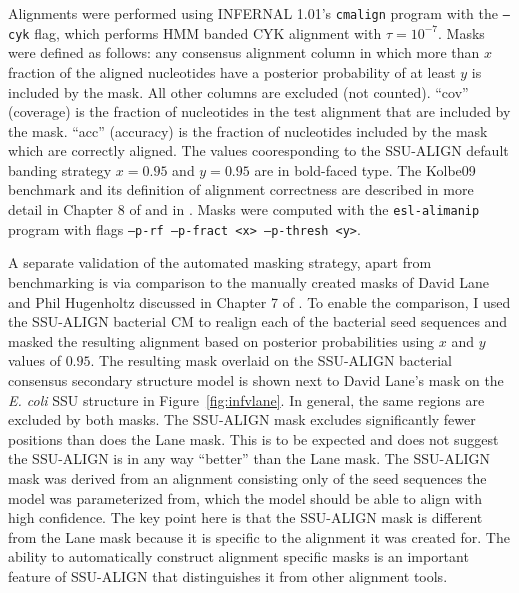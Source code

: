 \begin{table}
{  Alignments were performed using INFERNAL 1.01's {\tt cmalign}
  program with the {\tt --cyk} flag, which performs HMM banded CYK
  alignment with $\tau=10^{-7}$. Masks were defined as follows: any
  consensus alignment column in which more than $x$ fraction of the
  aligned nucleotides have a posterior probability of at least $y$ is
  included by the mask. All other columns are excluded (not
  counted). ``cov'' (coverage) is the fraction of nucleotides in the test
  alignment that are included by the mask. ``acc'' (accuracy) is the
  fraction of nucleotides included by the mask which are correctly
  aligned. The values cooresponding to the SSU-ALIGN default
  banding strategy $x=0.95$ and $y=0.95$ are in bold-faced type.  The
  Kolbe09 benchmark and its definition of alignment correctness are
  described in more detail in Chapter 8 of \cite{Nawrocki09b} and in
  \cite{KolbeEddy09}. Masks were computed with the {\tt esl-alimanip}
  program with flags {\tt --p-rf --p-fract <x> --p-thresh <y>}.}
\label{tbl:kolbe09-pp}
\end{table}

A separate validation of the automated masking strategy, apart from
benchmarking is via comparison to the manually created masks of David
Lane and Phil Hugenholtz discussed in Chapter 7 of \cite{Nawrocki09b}. To
enable the comparison, I used the SSU-ALIGN bacterial CM to
realign each of the bacterial seed sequences and masked the resulting
alignment based on posterior probabilities using $x$ and $y$ values of
$0.95$. The resulting mask overlaid on the SSU-ALIGN bacterial
consensus secondary structure model is shown next to David Lane's mask
on the \emph{E. coli} SSU structure in Figure~\ref{fig:infvlane}. In
general, the same regions are excluded by both masks. The
SSU-ALIGN mask excludes significantly fewer positions than does
the Lane mask.  This is to be expected and does not suggest the
SSU-ALIGN is in any way ``better'' than the Lane mask.  The
SSU-ALIGN mask was derived from an alignment consisting only of
the seed sequences the model was parameterized from, which the model should
be able to align with high confidence. The key point here is that the
SSU-ALIGN mask is different from the Lane mask because it is specific to the
alignment it was created for. The ability to automatically construct 
alignment specific masks is an important feature of SSU-ALIGN that
distinguishes it from other alignment tools. 

